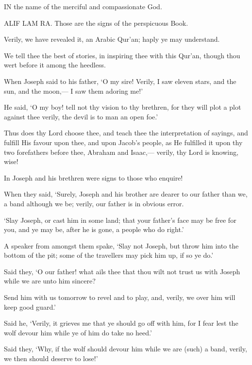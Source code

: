 \documentclass[fontsize=14pt, letterpaper, notitlepage, openany, DIV=12]{scrbook} %
\begin{document}
IN the name of the merciful and compassionate God.

\noindent[12:1]
ALIF LAM RA. Those are the signs of the perspicuous Book.

\noindent[12:2]
Verily, we have revealed it, an Arabic Qur'an; haply ye may understand.

\noindent[12:3]
We tell thee the best of stories, in inspiring thee with this Qur'an, though thou wert
before it among the heedless.

\noindent[12:4]
When Joseph said to his father, `O my sire! Verily, I saw eleven stars, and the sun, and
the moon,--- I saw them adoring me!'

\noindent[12:5]
He said, `O my boy! tell not thy vision to thy brethren, for they will plot a plot against
thee verily, the devil is to man an open foe.'

\noindent[12:6]
Thus does thy Lord choose thee, and teach thee the interpretation of sayings, and fulfill
His favour upon thee, and upon Jacob's people, as He fulfilled it upon thy two forefathers before
thee, Abraham and Isaac,--- verily, thy Lord is knowing, wise!

\noindent[12:7]
In Joseph and his brethren were signs to those who enquire!

\noindent[12:8]
When they said, `Surely, Joseph and his brother are dearer to our father than we, a band
although we be; verily, our father is in obvious error.

\noindent[12:9]
`Slay Joseph, or cast him in some land; that your father's face may be free for you, and ye
may be, after he is gone, a people who do right.'

\noindent[12:10]
A speaker from amongst them spake, `Slay not Joseph, but throw him into the bottom of
the pit; some of the travellers may pick him up, if so ye do.'

\noindent[12:11]
Said they, `O our father! what ails thee that thou wilt not trust us with Joseph while we
are unto him sincere?

\noindent[12:12]
Send him with us tomorrow to revel and to play, and, verily, we over him will keep good
guard.'

\noindent[12:13]
Said he, `Verily, it grieves me that ye should go off with him, for I fear lest the wolf
devour him while ye of him do take no heed.'

\noindent[12:14]
Said they, `Why, if the wolf should devour him while we are (such) a band, verily, we
then should deserve to lose!'
\end{document}
